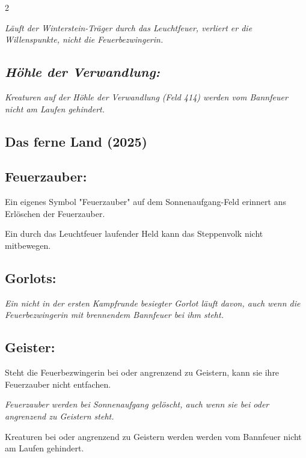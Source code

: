 \documentclass[10pt, a4paper, oneside]{book}
\newcommand{\fan}[1]{\textit{#1}}
\begin{document}
\begin{multicols*}{2}
\begin{bgcolor}
\fan{Läuft der Winterstein-Träger durch das Leuchtfeuer, verliert er die Willenspunkte, nicht die Feuerbezwingerin.}


\subsection{\fan{Höhle der Verwandlung:}}

\fan{Kreaturen auf der Höhle der Verwandlung (Feld 414) werden vom Bannfeuer nicht am Laufen gehindert.}


\end{bgcolor}



\columnbreak


\begin{bgcolor}
\section{Das ferne Land (2025)}

\subsection{Feuerzauber:}

Ein eigenes Symbol "Feuerzauber" auf dem Sonnenaufgang-Feld erinnert ans Erlöschen der Feuerzauber.

Ein durch das Leuchtfeuer laufender Held kann das Steppenvolk nicht mitbewegen.
\supercite{dfl-begleitheft}



\subsection{Gorlots:}

\fan{Ein nicht in der ersten Kampfrunde besiegter Gorlot läuft davon, auch wenn die Feuerbezwingerin mit brennendem Bannfeuer bei ihm steht.}



\subsection{Geister:}

Steht die Feuerbezwingerin bei oder angrenzend zu Geistern, kann sie ihre Feuerzauber nicht entfachen.

\fan{Feuerzauber werden bei Sonnenaufgang gelöscht, auch wenn sie bei oder angrenzend zu Geistern steht.}

Kreaturen bei oder angrenzend zu Geistern werden werden vom Bannfeuer nicht am Laufen gehindert.


\end{bgcolor}
\end{multicols*}
\end{document}
